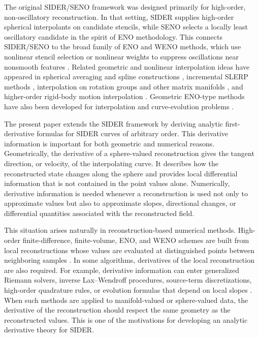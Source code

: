 \documentclass[a4paper,11pt]{article}
\numberwithin{equation}{section}
\theoremstyle{plain}
\theoremstyle{definition}
\theoremstyle{remark}
\begin{document}
The original SIDER/SENO framework was designed primarily for high-order, non-oscillatory reconstruction.  In that setting, SIDER supplies high-order spherical interpolants on candidate stencils, while SENO selects a locally least oscillatory candidate in the spirit of ENO methodology.  This connects SIDER/SENO to the broad family of ENO and WENO methods, which use nonlinear stencil selection or nonlinear weights to suppress oscillations near nonsmooth features \cite{harengoshcha87,shuosh88,liu_94,shu97}.  Related geometric and nonlinear interpolation ideas have appeared in spherical averaging and spline constructions \cite{busfil01}, incremental SLERP methods \cite{barhasben04}, interpolation on rotation groups and other matrix manifolds \cite{shi09,gawleo18}, and higher-order rigid-body motion interpolation \cite{haarbach_18}.  Geometric ENO-type methods have also been developed for interpolation and curve-evolution problems \cite{sidkimshu97}.

The present paper extends the SIDER framework by deriving analytic first-derivative formulas for SIDER curves of arbitrary order.  This derivative information is important for both geometric and numerical reasons.  Geometrically, the derivative of a sphere-valued reconstruction gives the tangent direction, or velocity, of the interpolating curve.  It describes how the reconstructed state changes along the sphere and provides local differential information that is not contained in the point values alone.  Numerically, derivative information is needed whenever a reconstruction is used not only to approximate values but also to approximate slopes, directional changes, or differential quantities associated with the reconstructed field.

This situation arises naturally in reconstruction-based numerical methods.  High-order finite-difference, finite-volume, ENO, and WENO schemes are built from local reconstructions whose values are evaluated at distinguished points between neighboring samples \cite{harengoshcha87,shuosh88,liu_94,shu97}.  In some algorithms, derivatives of the local reconstruction are also required.  For example, derivative information can enter generalized Riemann solvers, inverse Lax--Wendroff procedures, source-term discretizations, high-order quadrature rules, or evolution formulas that depend on local slopes \cite{liosou95,dinshuzha20}.  When such methods are applied to manifold-valued or sphere-valued data, the derivative of the reconstruction should respect the same geometry as the reconstructed values.  This is one of the motivations for developing an analytic derivative theory for SIDER.
\end{document}
